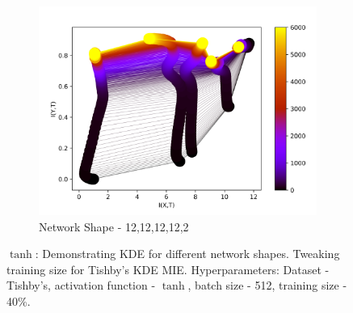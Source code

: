 \documentclass[dissertation.tex]{subfiles}
\begin{document}
\begin{figure}[ht]
  \begin{subfigure}[t]{0.32\textwidth}
    \centering
    \includegraphics[width=\textwidth]{figs/eval/networkShape/KDE12,12,12.png}
    \caption{
      Network Shape - 12,12,12,12,2
    }
    \label{figNetworkShape3}
  \end{subfigure}
  \hfill
  \caption{
      $\tanh$: Demonstrating KDE for different network shapes.  Tweaking training
      size for Tishby's KDE MIE. Hyperparameters: Dataset - Tishby's, activation
      function - $\tanh$, batch size - 512, training size - 40\%.
    }
  \label{figNetworkShapes}
\end{figure}
  
\end{document}
